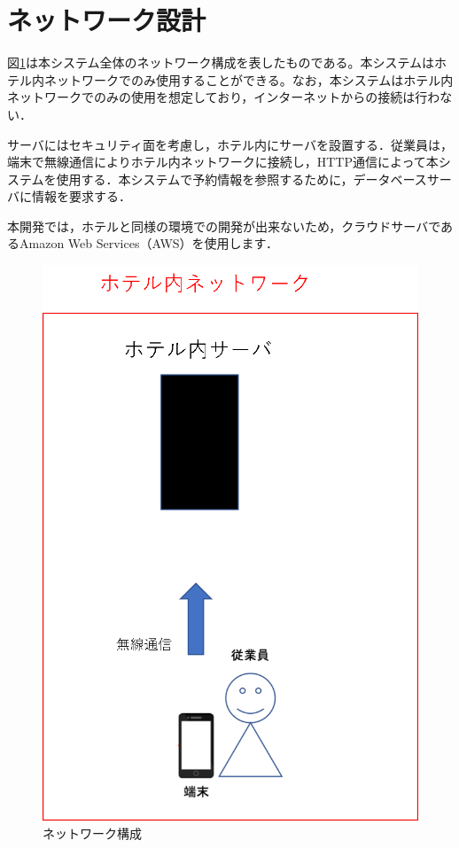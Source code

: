 \documentclass[main]{subfiles}
\begin{document}
\section{ネットワーク設計}
図\ref{fig:inamura2}は本システム全体のネットワーク構成を表したものである。本システムはホテル内ネットワークでのみ使用することができる。なお，本システムはホテル内ネットワークでのみの使用を想定しており，インターネットからの接続は行わない．

サーバにはセキュリティ面を考慮し，ホテル内にサーバを設置する．従業員は，端末で無線通信によりホテル内ネットワークに接続し，HTTP通信によって本システムを使用する．本システムで予約情報を参照するために，データベースサーバに情報を要求する．

本開発では，ホテルと同様の環境での開発が出来ないため，クラウドサーバであるAmazon Web Services（AWS）を使用します．

\begin{figure}[H]
\begin{center}
\includegraphics[scale=0.6]{kadai2-inamura3.png}
\caption{ネットワーク構成}
\label{fig:inamura2}
\end{center}
\end{figure}
\end{document}
